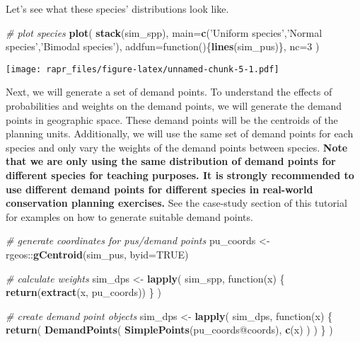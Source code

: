 \documentclass[11pt,]{article}
\newenvironment{Shaded}{\begin{snugshade}}{\end{snugshade}}
\newcommand{\KeywordTok}[1]{\textcolor[rgb]{0.13,0.29,0.53}{\textbf{{#1}}}}
\newcommand{\DataTypeTok}[1]{\textcolor[rgb]{0.13,0.29,0.53}{{#1}}}
\newcommand{\DecValTok}[1]{\textcolor[rgb]{0.00,0.00,0.81}{{#1}}}
\newcommand{\StringTok}[1]{\textcolor[rgb]{0.31,0.60,0.02}{{#1}}}
\newcommand{\CommentTok}[1]{\textcolor[rgb]{0.56,0.35,0.01}{\textit{{#1}}}}
\newcommand{\OtherTok}[1]{\textcolor[rgb]{0.56,0.35,0.01}{{#1}}}
\newcommand{\NormalTok}[1]{{#1}}
\let\origfigure\figure
\let\endorigfigure\endfigure
\renewenvironment{figure}[1][2] {
	\expandafter\origfigure\expandafter[H]
} {
	\endorigfigure
}
\begin{document}
Let's see what these species' distributions look like.

\begin{Shaded}
\begin{Highlighting}[]
\CommentTok{# plot species}
\KeywordTok{plot}\NormalTok{(}
    \KeywordTok{stack}\NormalTok{(sim_spp),}
    \DataTypeTok{main=}\KeywordTok{c}\NormalTok{(}\StringTok{'Uniform species'}\NormalTok{,}\StringTok{'Normal species'}\NormalTok{,}\StringTok{'Bimodal species'}\NormalTok{),}
    \DataTypeTok{addfun=}\NormalTok{function()\{}\KeywordTok{lines}\NormalTok{(sim_pus)\},}
    \DataTypeTok{nc=}\DecValTok{3}
\NormalTok{)}
\end{Highlighting}
\end{Shaded}

\begin{figure}[htbp]
\centering
\texttt{[image: rapr\_files/figure-latex/unnamed-chunk-5-1.pdf]}
\caption{Distribution of three simulated species. Each square represents
a planning unit. The colour of each square denotes the probability that
individuals from each species occupy it.}
\end{figure}

Next, we will generate a set of demand points. To understand the effects
of probabilities and weights on the demand points, we will generate the
demand points in geographic space. These demand points will be the
centroids of the planning units. Additionally, we will use the same set
of demand points for each species and only vary the weights of the
demand points between species. \textbf{Note that we are only using the
same distribution of demand points for different species for teaching
purposes. It is strongly recommended to use different demand points for
different species in real-world conservation planning exercises.} See
the case-study section of this tutorial for examples on how to generate
suitable demand points.

\begin{Shaded}
\begin{Highlighting}[]
\CommentTok{# generate coordinates for pus/demand points}
\NormalTok{pu_coords <-}\StringTok{ }\NormalTok{rgeos::}\KeywordTok{gCentroid}\NormalTok{(sim_pus, }\DataTypeTok{byid=}\OtherTok{TRUE}\NormalTok{)}

\CommentTok{# calculate weights}
\NormalTok{sim_dps <-}\StringTok{ }\KeywordTok{lapply}\NormalTok{(}
    \NormalTok{sim_spp,}
    \NormalTok{function(x) \{}
        \KeywordTok{return}\NormalTok{(}\KeywordTok{extract}\NormalTok{(x, pu_coords))}
    \NormalTok{\}}
\NormalTok{)}

\CommentTok{# create demand point objects}
\NormalTok{sim_dps <-}\StringTok{ }\KeywordTok{lapply}\NormalTok{(}
    \NormalTok{sim_dps,}
    \NormalTok{function(x) \{}
        \KeywordTok{return}\NormalTok{(}
            \KeywordTok{DemandPoints}\NormalTok{(}
                \KeywordTok{SimplePoints}\NormalTok{(pu_coords@coords),}
                \KeywordTok{c}\NormalTok{(x)}
            \NormalTok{)}
        \NormalTok{)}
    \NormalTok{\}}
\NormalTok{)}
\end{Highlighting}
\end{Shaded}
\end{document}
